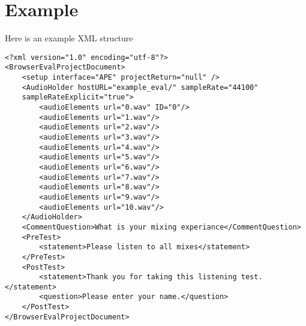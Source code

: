 \documentclass{article}
\begin{document}
\section{Example}

Here is an example XML structure

\begin{lstlisting}
<?xml version="1.0" encoding="utf-8"?>
<BrowserEvalProjectDocument>
	<setup interface="APE" projectReturn="null" />
	<AudioHolder hostURL="example_eval/" sampleRate="44100"
	sampleRateExplicit="true">
		<audioElements url="0.wav" ID="0"/>
		<audioElements url="1.wav"/>
		<audioElements url="2.wav"/>
		<audioElements url="3.wav"/>
		<audioElements url="4.wav"/>
		<audioElements url="5.wav"/>
		<audioElements url="6.wav"/>
		<audioElements url="7.wav"/>
		<audioElements url="8.wav"/>
		<audioElements url="9.wav"/>
		<audioElements url="10.wav"/>
	</AudioHolder>
	<CommentQuestion>What is your mixing experiance</CommentQuestion>
	<PreTest>
		<statement>Please listen to all mixes</statement>
	</PreTest>
	<PostTest>
		<statement>Thank you for taking this listening test.</statement>
		<question>Please enter your name.</question>
	</PostTest>
</BrowserEvalProjectDocument>
\end{lstlisting}
\end{document}
